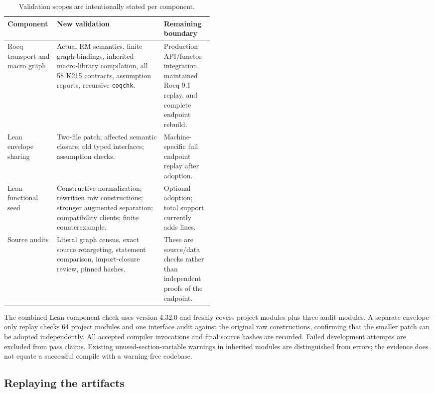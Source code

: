 \documentclass[11pt,letterpaper]{article}
\theoremstyle{definition}\newtheorem{definition}[theorem]{Definition}
\theoremstyle{remark}\newtheorem{remark}[theorem]{Remark}
\newcommand{\code}[1]{\texttt{\small #1}}
\begin{document}
\begin{table}[ht]
\centering\small
\begin{tabularx}{\linewidth}{@{}p{0.24\linewidth}Xp{0.24\linewidth}@{}}
\toprule
Component & New validation & Remaining boundary\\
\midrule
Rocq transport and macro graph & Actual RM semantics, finite graph bindings, inherited macro-library compilation, all 58 K215 contracts, assumption reports, recursive \code{coqchk}. & Production API/functor integration, maintained Rocq 9.1 replay, and complete endpoint rebuild.\\
Lean envelope sharing & Two-file patch; affected semantic closure; old typed interfaces; assumption checks. & Machine-specific full endpoint replay after adoption.\\
Lean functional seed & Constructive normalization; rewritten raw constructions; stronger augmented separation; compatibility clients; finite counterexample. & Optional adoption; total support currently adds lines.\\
Source audits & Literal graph census, exact source retargeting, statement comparison, import-closure review, pinned hashes. & These are source/data checks rather than independent proofs of the endpoint.\\
\bottomrule
\end{tabularx}
\caption{Validation scopes are intentionally stated per component.}
\end{table}

The combined Lean component check uses version 4.32.0 and freshly covers \LeanProjectCount{} project modules plus three audit modules. A separate envelope-only replay checks 64 project modules and one interface audit against the original raw constructions, confirming that the smaller patch can be adopted independently. All accepted compiler invocations and final source hashes are recorded. Failed development attempts are excluded from pass claims. Existing unused-section-variable warnings in inherited modules are distinguished from errors; the evidence does not equate a successful compile with a warning-free codebase.

\subsection{Replaying the artifacts}
\end{document}
